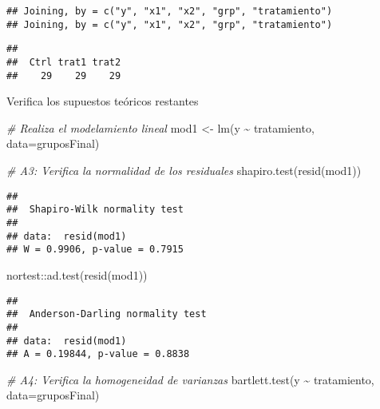 \documentclass[
]{article}
\newenvironment{Shaded}{}{}
\newcommand{\AttributeTok}[1]{\textcolor[rgb]{0.49,0.56,0.16}{#1}}
\newcommand{\CommentTok}[1]{\textcolor[rgb]{0.38,0.63,0.69}{\textit{#1}}}
\newcommand{\FunctionTok}[1]{\textcolor[rgb]{0.02,0.16,0.49}{#1}}
\newcommand{\NormalTok}[1]{#1}
\newcommand{\OtherTok}[1]{\textcolor[rgb]{0.00,0.44,0.13}{#1}}
\newcommand{\SpecialCharTok}[1]{\textcolor[rgb]{0.25,0.44,0.63}{#1}}
\begin{document}
\begin{verbatim}
## Joining, by = c("y", "x1", "x2", "grp", "tratamiento")
## Joining, by = c("y", "x1", "x2", "grp", "tratamiento")
\end{verbatim}

\begin{Shaded}
\end{Shaded}

\begin{verbatim}
## 
##  Ctrl trat1 trat2 
##    29    29    29
\end{verbatim}

Verifica los supuestos teóricos restantes

\begin{Shaded}
\begin{Highlighting}[]
\CommentTok{\# Realiza el modelamiento lineal}
\NormalTok{mod1 }\OtherTok{\textless{}{-}} \FunctionTok{lm}\NormalTok{(y }\SpecialCharTok{\textasciitilde{}}\NormalTok{ tratamiento, }\AttributeTok{data=}\NormalTok{gruposFinal)}

\CommentTok{\# A3: Verifica la normalidad de los residuales}
\FunctionTok{shapiro.test}\NormalTok{(}\FunctionTok{resid}\NormalTok{(mod1))}
\end{Highlighting}
\end{Shaded}

\begin{verbatim}
## 
##  Shapiro-Wilk normality test
## 
## data:  resid(mod1)
## W = 0.9906, p-value = 0.7915
\end{verbatim}

\begin{Shaded}
\begin{Highlighting}[]
\NormalTok{nortest}\SpecialCharTok{::}\FunctionTok{ad.test}\NormalTok{(}\FunctionTok{resid}\NormalTok{(mod1))}
\end{Highlighting}
\end{Shaded}

\begin{verbatim}
## 
##  Anderson-Darling normality test
## 
## data:  resid(mod1)
## A = 0.19844, p-value = 0.8838
\end{verbatim}

\begin{Shaded}
\begin{Highlighting}[]
\CommentTok{\# A4: Verifica la homogeneidad de varianzas}
\FunctionTok{bartlett.test}\NormalTok{(y }\SpecialCharTok{\textasciitilde{}}\NormalTok{ tratamiento, }\AttributeTok{data=}\NormalTok{gruposFinal)}
\end{Highlighting}
\end{Shaded}
\end{document}
